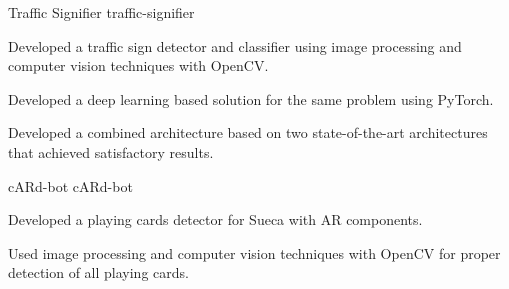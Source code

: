 

\begin{cvprojects}

  \cvproject
  {Traffic Signifier} %
  {traffic-signifier} %
    {
      \begin{cvitems} %
        \item {Developed a traffic sign detector and classifier using image processing and computer vision techniques with OpenCV.}
        \item {Developed a deep learning based solution for the same problem using PyTorch.}
        \item {Developed a combined architecture based on two state-of-the-art architectures that achieved satisfactory results.}
      \end{cvitems}
    }

  \cvproject
  {cARd-bot} %
  {cARd-bot} %
    {
      \begin{cvitems} %
        \item {Developed a playing cards detector for Sueca with AR components.}
        \item {Used image processing and computer vision techniques with OpenCV for proper detection of all playing cards.}
      \end{cvitems}
    }

\end{cvprojects}
